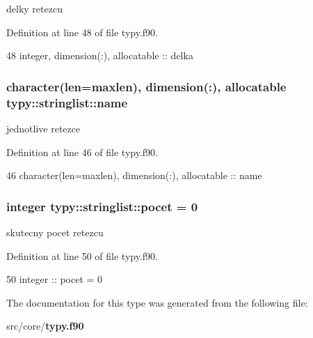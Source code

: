 delky retezcu 



Definition at line 48 of file typy.\+f90.


\begin{DoxyCode}
48         \textcolor{keywordtype}{integer}, \textcolor{keywordtype}{dimension(:)}, \textcolor{keywordtype}{allocatable} :: delka
\end{DoxyCode}
\subsubsection[{name}]{\setlength{\rightskip}{0pt plus 5cm}character(len={\bf maxlen}), dimension(\+:), allocatable typy\+::stringlist\+::name}\label{structtypy_1_1stringlist_a0dc0ab703e7cd05a3844c471c2c770db}


jednotlive retezce 



Definition at line 46 of file typy.\+f90.


\begin{DoxyCode}
46         \textcolor{keywordtype}{character(len=maxlen)}, \textcolor{keywordtype}{dimension(:)}, \textcolor{keywordtype}{allocatable} :: name
\end{DoxyCode}
\subsubsection[{pocet}]{\setlength{\rightskip}{0pt plus 5cm}integer typy\+::stringlist\+::pocet = 0}\label{structtypy_1_1stringlist_ace662802f4d08c9019c64e2b97b0d4e5}


skutecny pocet retezcu 



Definition at line 50 of file typy.\+f90.


\begin{DoxyCode}
50         \textcolor{keywordtype}{integer} :: pocet = 0
\end{DoxyCode}


The documentation for this type was generated from the following file\+:\begin{DoxyCompactItemize}
\item 
src/core/{\bf typy.\+f90}\end{DoxyCompactItemize}
